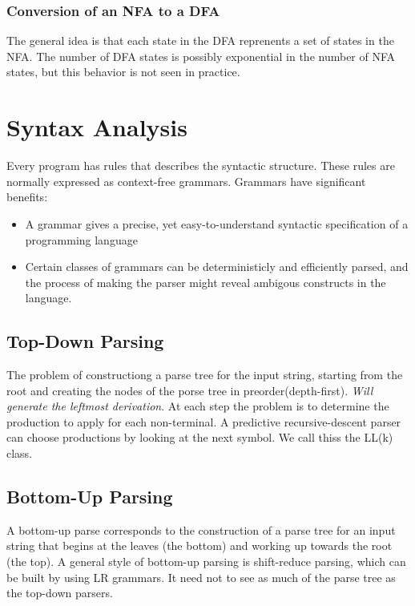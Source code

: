 \documentclass{article}
\begin{document}
\subsubsection{Conversion of an NFA to a DFA} %
\label{ssub:Conversion of an NFA to a DFA}
The general idea is that each state in the DFA reprenents a set of states in the NFA. The number of DFA states is possibly exponential in the number of NFA states, but this behavior is not seen in practice.



\section{Syntax Analysis} %
\label{sec:Syntax Analysis}
Every program has rules that describes the syntactic structure. These rules are normally expressed as context-free grammars. Grammars have significant benefits:
\begin{itemize}
	\item A grammar gives a precise, yet easy-to-understand syntactic specification of a programming language
	\item Certain classes of grammars can be deterministicly and efficiently parsed, and the process of making the parser might reveal ambigous constructs in the language.
\end{itemize}

\subsection{Top-Down Parsing} %
\label{sub:Top-Down Parsing}
The problem of constructiong a parse tree for the input string, starting from the root and creating the nodes of the porse tree in preorder(depth-first). \emph{Will generate the leftmost derivation}. At each step the problem is to determine the production to apply for each non-terminal. A predictive recursive-descent parser can choose productions by looking at the next symbol. We call thiss the LL(k) class.

\subsection{Bottom-Up Parsing} %
\label{sub:Bottom-Up Parsing}
A bottom-up parse corresponds to the construction of a parse tree for an input string that begins at the leaves (the bottom) and working up towards the root (the top). A general style of bottom-up parsing is shift-reduce parsing, which can be built by using LR grammars. It need not to see as much of the parse tree as the top-down parsers.
\end{document}
